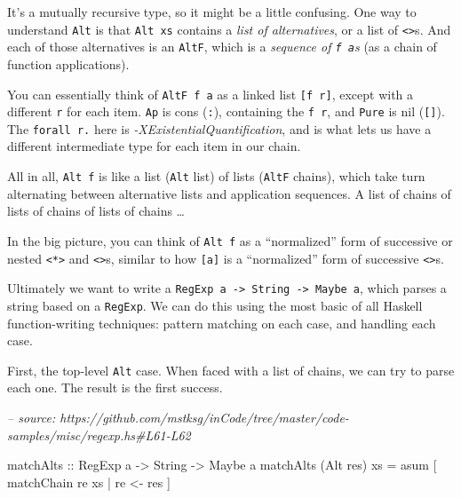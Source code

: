 \documentclass[]{article}
\newenvironment{Shaded}{}{}
\newcommand{\CommentTok}[1]{\textcolor[rgb]{0.38,0.63,0.69}{\textit{#1}}}
\newcommand{\DataTypeTok}[1]{\textcolor[rgb]{0.56,0.13,0.00}{#1}}
\newcommand{\FunctionTok}[1]{\textcolor[rgb]{0.02,0.16,0.49}{#1}}
\newcommand{\NormalTok}[1]{#1}
\newcommand{\OtherTok}[1]{\textcolor[rgb]{0.00,0.44,0.13}{#1}}
\begin{document}
It's a mutually recursive type, so it might be a little confusing. One way to
understand \texttt{Alt} is that \texttt{Alt\ xs} contains a \emph{list of
alternatives}, or a list of \texttt{\textless{}\textbar{}\textgreater{}}s. And
each of those alternatives is an \texttt{AltF}, which is a \emph{sequence of
\texttt{f\ a}s} (as a chain of function applications).

You can essentially think of \texttt{AltF\ f\ a} as a linked list
\texttt{{[}f\ r{]}}, except with a different \texttt{r} for each item.
\texttt{Ap} is cons (\texttt{:}), containing the \texttt{f\ r}, and
\texttt{Pure} is nil (\texttt{{[}{]}}). The \texttt{forall\ r.} here is
\emph{-XExistentialQuantification}, and is what lets us have a different
intermediate type for each item in our chain.

All in all, \texttt{Alt\ f} is like a list (\texttt{Alt} list) of lists
(\texttt{AltF} chains), which take turn alternating between alternative lists
and application sequences. A list of chains of lists of chains of lists of
chains \ldots{}

In the big picture, you can think of \texttt{Alt\ f} as a ``normalized'' form of
successive or nested \texttt{\textless{}*\textgreater{}} and
\texttt{\textless{}\textbar{}\textgreater{}}s, similar to how \texttt{{[}a{]}}
is a ``normalized'' form of successive \texttt{\textless{}\textgreater{}}s.

Ultimately we want to write a
\texttt{RegExp\ a\ -\textgreater{}\ String\ -\textgreater{}\ Maybe\ a}, which
parses a string based on a \texttt{RegExp}. We can do this using the most basic
of all Haskell function-writing techniques: pattern matching on each case, and
handling each case.

First, the top-level \texttt{Alt} case. When faced with a list of chains, we can
try to parse each one. The result is the first success.

\begin{Shaded}
\begin{Highlighting}[]
\CommentTok{-- source: https://github.com/mstksg/inCode/tree/master/code-samples/misc/regexp.hs#L61-L62}

\OtherTok{matchAlts ::} \DataTypeTok{RegExp}\NormalTok{ a }\OtherTok{->} \DataTypeTok{String} \OtherTok{->} \DataTypeTok{Maybe}\NormalTok{ a}
\NormalTok{matchAlts (}\DataTypeTok{Alt}\NormalTok{ res) xs }\FunctionTok{=}\NormalTok{ asum [ matchChain re xs }\FunctionTok{|}\NormalTok{ re }\OtherTok{<-}\NormalTok{ res  ]}
\end{Highlighting}
\end{Shaded}
\end{document}
